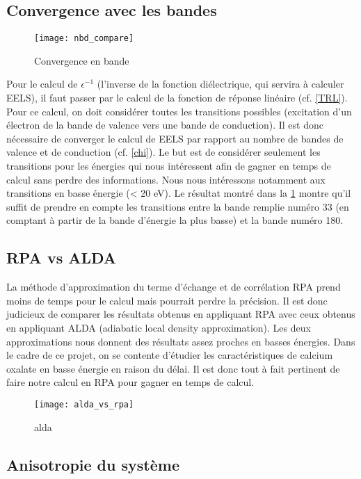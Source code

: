 \subsection{Convergence avec les bandes}

\begin{figure}[!h]\label{fig-cv_nbd}
    \centering
    \texttt{[image: nbd\_compare]}
    \caption{Convergence en bande}
\end{figure}

Pour le calcul de $\epsilon^{-1}$ (l'inverse de la fonction diélectrique, qui servira à calculer EELS),
il faut passer par le calcul de la fonction de réponse linéaire (cf. \cref{TRL}).
Pour ce calcul, on doit considérer toutes les transitions possibles
(excitation d'un électron de la bande de valence vers une bande de conduction).
Il est donc nécessaire de converger le calcul de EELS par rapport au nombre de bandes de valence
et de conduction (cf. \cref{chi}).
Le but est de considérer seulement les transitions pour les énergies qui nous intéressent
afin de gagner en temps de calcul sans perdre des informations.
Nous nous intéressons notamment aux transitions en basse énergie (< 20 eV).
Le résultat montré dans la \cref{fig-cv_nbd} montre qu'il suffit de prendre en compte
les transitions entre la bande remplie numéro 33
(en comptant à partir de la bande d'énergie la plus basse) et la bande numéro 180.

\subsection{RPA vs ALDA}
La méthode d'approximation du terme d'échange et de corrélation RPA prend moins de temps
pour le calcul mais pourrait perdre la précision.
Il est donc judicieux de comparer les résultats obtenus en appliquant RPA avec ceux obtenus
en appliquant ALDA (adiabatic local density approximation).
Les deux approximations nous donnent des résultats assez proches en basses énergies.
Dans le cadre de ce projet, on se contente d'étudier les caractéristiques
de calcium oxalate en basse énergie en raison du délai.
Il est donc tout à fait pertinent de faire notre calcul en RPA pour gagner en temps de calcul.
\begin{figure}[!h]
    \centering
    \texttt{[image: alda\_vs\_rpa]}
    \caption{alda}
\end{figure}
\subsection{Anisotropie du système}

